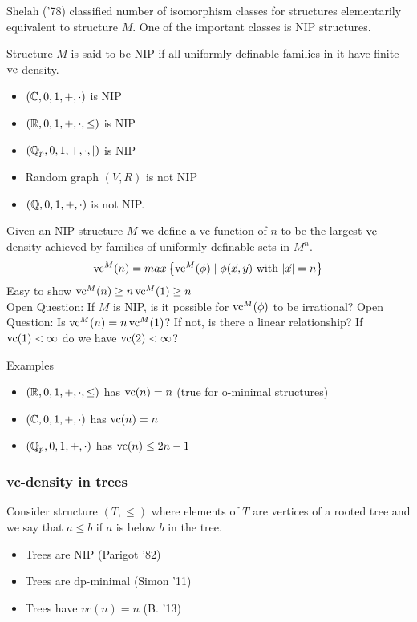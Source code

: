 \documentclass{beamer}
\newcommand{\curly}[1]{\left\{ #1 \right\}}
\newcommand{\defn}{\underline}
\begin{document}
\begin{frame}
	Shelah ('78) classified number of isomorphism classes for structures elementarily equivalent to structure $M$.
	One of the important classes is NIP structures. \\
	\begin{Definition}
		Structure $M$ is said to be \defn{NIP} if all uniformly definable families in it have finite $\operatorname{vc}$-density.
	\end{Definition}
	\begin{itemize}
		\item $(\mathbb{C}, 0, 1, +, \cdot)$ is NIP
		\item $(\mathbb{R}, 0, 1, +, \cdot, \leq)$ is NIP
		\item $(\mathbb{Q}_p, 0, 1, +, \cdot, \mid)$ is NIP
		\item Random graph $(V, R)$ is not NIP
		\item $(\mathbb{Q}, 0, 1, +, \cdot)$ is not NIP.
	\end{itemize}
\end{frame}

\begin{frame}
	Given an NIP structure $M$ we define a vc-function of $n$ to be the largest $\operatorname{vc}$-density achieved by families of uniformly definable sets in $M^n$.
	\begin{align*}
		\vc^M(n) = max \curly{ \vc^M(\phi) \mid \phi(\vec x, \vec y) \text{ with } |\vec x| = n}
	\end{align*}
	Easy to show $\operatorname{vc}^M(n) \geq n \operatorname{vc}^M(1) \geq n$ \\

	Open Question: If $M$ is NIP, is it possible for $\operatorname{vc}^M(\phi)$ to be irrational?
	Open Question: Is $\operatorname{vc}^M(n) = n \operatorname{vc}^M(1)$? If not, is there a linear relationship? If $\operatorname{vc}(1) < \infty$ do we have $\operatorname{vc}(2) < \infty$?
\end{frame}

\begin{frame}
	Examples
	\begin{itemize}
		\item $(\mathbb{R}, 0, 1, +, \cdot, \leq)$ has $\operatorname{vc}(n) = n$ (true for o-minimal structures)
		\item $(\mathbb{C}, 0, 1, +, \cdot)$ has $\operatorname{vc}(n) = n$
		\item $(\mathbb{Q}_p, 0, 1, +, \cdot)$ has $\operatorname{vc}(n) \leq 2n - 1$
	\end{itemize}
\end{frame}

\begin{frame}
	\frametitle{vc-density in trees}
	Consider structure $(T, \leq)$ where elements of $T$ are vertices of a rooted tree and we say that $a \leq b$ if $a$ is below $b$ in the tree.
	\begin{itemize}
		\item Trees are NIP (Parigot '82)
		\item Trees are dp-minimal (Simon '11)
		\item Trees have $vc(n) = n$ (B. '13)
	\end{itemize}
\end{frame}
\end{document}
